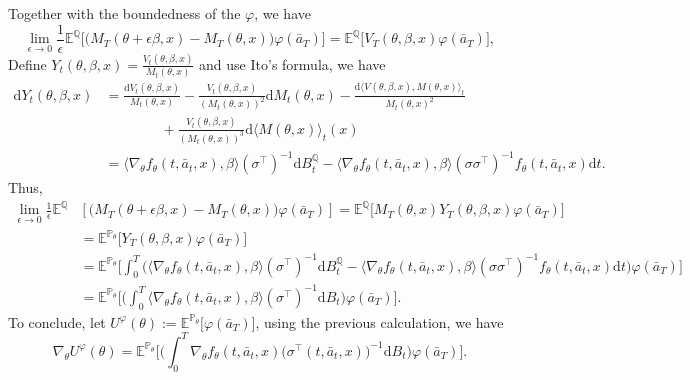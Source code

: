 \documentclass{article}
\newcommand{\1}{\mathbbm{1}}
\numberwithin{equation}{section}
\def\to{\rightarrow}
\def\d{{\mathrm{d}}}
\def\sE{{\mathbb{E}}}
\def\sP{\mathbb{P}}
\def\sQ{{\mathbb{Q}}}
\begin{document}
Together with the boundedness of the $\varphi$, we have 
\begin{equation*}
    \lim_{\epsilon\to 0}\frac{1}{\epsilon}\sE^\sQ\big[\big(M_T(\theta+\epsilon\beta,x)-M_T(\theta,x)\big)\varphi(\bar a_T)\big]=\sE^\sQ\big[V_T(\theta,\beta,x)\varphi(\bar a_T)\big],
\end{equation*}
Define  $Y_t^{}(\theta,\beta,x)=\frac{V_t^{}(\theta,\beta,x)}{M_t(\theta,x)}$ and use Ito's formula, we have
\begin{equation*}
    \begin{aligned}
    \d Y_t^{}(\theta,\beta,x) &= \frac{\d V_t^{}(\theta,\beta,x)}{M_t(\theta,x)}-\frac{V_t^{}(\theta,\beta,x)}{(M_t(\theta,x))^2}\d M_t(\theta,x)-\frac{\d \big\langle V^{}(\theta,\beta,x),M(\theta,x)\big\rangle_t}{M_t(\theta,x)^2}
    \\
    &\qquad\qquad+\frac{V_t(\theta,\beta,x)}{(M_t(\theta,x))^3}\d \big\langle M(\theta,x)\big\rangle_t(x)
    \\
    &={\big\langle\nabla_\theta f_\theta(t,\bar a_t,x),\beta\big\rangle }(\sigma^\top)^{-1}\d B_t^\sQ-{\big\langle\nabla_\theta f_\theta(t,\bar a_t,x),\beta\big\rangle (\sigma\sigma^\top)^{-1}f_\theta(t,\bar a_t,x)}\d t.
    \end{aligned}
\end{equation*}
Thus,
\begin{equation*}
    \begin{aligned}
    \lim_{\epsilon\to 0}\frac{1}{\epsilon}\sE^\sQ&\left[\big(M^{}_T(\theta+\epsilon\beta,x)-M^{}_T(\theta,x)\big)\varphi(\bar a_T)\right]=\sE^\sQ\big[M_T(\theta ,x)Y_T^{}(\theta,\beta,x)\varphi(\bar a_T)\big]
    \\
    &=\sE^{\sP_\theta}\big[Y_T^{}(\theta,\beta,x)\varphi(\bar a_T)\big]
    \\
    &=\sE^{\sP_\theta}\bigg[\int_0^T\Big({\big\langle\nabla_\theta f_\theta(t,\bar a_t,x),\beta\big\rangle }(\sigma^\top)^{-1}\d B_t^\sQ-{\big\langle\nabla_\theta f_\theta(t,\bar a_t,x),\beta\big\rangle (\sigma\sigma^\top)^{-1}f_\theta(t,\bar a_t,x)}\d t\Big)\varphi(\bar a_T)\bigg]
    \\
    &=\sE^{\sP_\theta}\bigg[\bigg(\int_0^T{\big\langle\nabla_\theta f_\theta(t,\bar a_t,x),\beta\big\rangle }{(\sigma^\top)^{-1}}\d B_t\bigg)\varphi(\bar a_T)\bigg].
    \end{aligned}
\end{equation*}
To conclude, let $U^\varphi(\theta):=\sE^{\sP_\theta}\big[\varphi(\bar a_T)\big]$, using the previous calculation, we have
$$
\nabla_\theta U^\varphi(\theta)=\sE^{\sP_\theta}\bigg[\bigg(\int_0^T{\nabla_\theta f_\theta(t,\bar a_t,x)}\big(\sigma^\top(t,\bar a_t,x)\big)^{-1}\d B_t\bigg)\varphi(\bar a_T)\bigg].
$$
\end{document}

